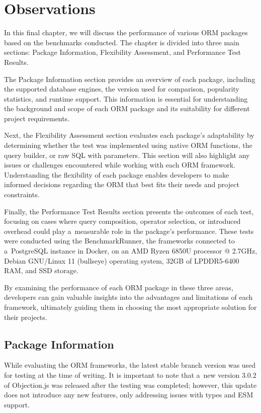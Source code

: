 \chapter{Observations}\label{ch:observations}

In this final chapter, we will discuss the performance of various ORM packages
based on the benchmarks conducted. The chapter is divided into three main
sections: Package Information, Flexibility Assessment, and Performance Test
Results.

The Package Information section provides an overview of each package, including
the supported database engines, the version used for comparison, popularity
statistics, and runtime support. This information is essential for understanding
the background and scope of each ORM package and its suitability for different
project requirements.

Next, the Flexibility Assessment section evaluates each package's adaptability
by determining whether the test was implemented using native ORM functions, the
query builder, or raw SQL with parameters. This section will also highlight any
issues or challenges encountered while working with each ORM framework.
Understanding the flexibility of each package enables developers to make
informed decisions regarding the ORM that best fits their needs and project
constraints.

Finally, the Performance Test Results section presents the outcomes of each
test, focusing on cases where query composition, operator selection, or
introduced overhead could play a~measurable role in the package's performance.
These tests were conducted using the BenchmarkRunner, the frameworks connected
to a~PostgreSQL instance in Docker, on an AMD Ryzen 6850U processor @ 2.7GHz,
Debian GNU/Linux 11 (bullseye) operating system, 32GB of LPDDR5-6400 RAM, and
SSD storage.

By examining the performance of each ORM package in these three areas,
developers can gain valuable insights into the advantages and limitations of
each framework, ultimately guiding them in choosing the most appropriate
solution for their projects.

\section{Package Information}

While evaluating the ORM frameworks, the latest stable branch version was used
for testing at the time of writing. It is important to note that a~new version
3.0.2 of Objection.js was released after the testing was completed; however,
this update does not introduce any new features, only addressing issues with
types and ESM support.

